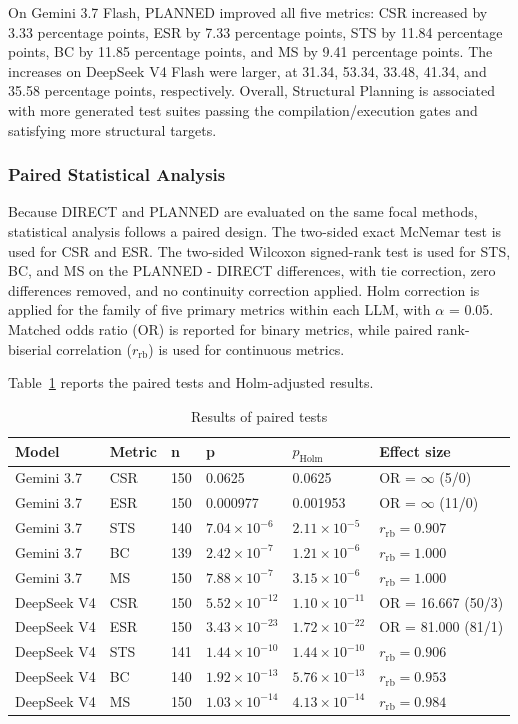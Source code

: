 \documentclass[pdflatex,sn-basic,Numbered,iicol]{sn-jnl}
\begin{document}
On Gemini 3.7 Flash, PLANNED improved all five metrics: CSR increased by 3.33 percentage points, ESR by 7.33 percentage points, STS by 11.84 percentage points, BC by 11.85 percentage points, and MS by 9.41 percentage points. The increases on DeepSeek V4 Flash were larger, at 31.34, 53.34, 33.48, 41.34, and 35.58 percentage points, respectively. Overall, Structural Planning is associated with more generated test suites passing the compilation/execution gates and satisfying more structural targets.

\subsubsection{Paired Statistical Analysis}\label{subsubsec:rq1-paired}

Because DIRECT and PLANNED are evaluated on the same focal methods, statistical analysis follows a paired design. The two-sided exact McNemar test is used for CSR and ESR. The two-sided Wilcoxon signed-rank test is used for STS, BC, and MS on the PLANNED - DIRECT differences, with tie correction, zero differences removed, and no continuity correction applied. Holm correction is applied for the family of five primary metrics within each LLM, with \ensuremath{\alpha} = 0.05. Matched odds ratio (OR) is reported for binary metrics, while paired rank-biserial correlation ($r_{\mathrm{rb}}$) is used for continuous metrics.

Table~\ref{tab:rq1-paired} reports the paired tests and Holm-adjusted results.

\begin{table}[htbp]
\caption{Results of paired tests}\label{tab:rq1-paired}
\centering
\scriptsize
\begin{tabular}{@{}llllll@{}}
\toprule
Model & Metric & n & p & $p_{\mathrm{Holm}}$ & Effect size \\
\midrule
Gemini 3.7 & CSR & 150 & 0.0625 & 0.0625 & OR = $\infty$ (5/0) \\
Gemini 3.7 & ESR & 150 & 0.000977 & 0.001953 & OR = $\infty$ (11/0) \\
Gemini 3.7 & STS & 140 & $7.04\times10^{-6}$ & $2.11\times10^{-5}$ & $r_{\mathrm{rb}}=0.907$ \\
Gemini 3.7 & BC & 139 & $2.42\times10^{-7}$ & $1.21\times10^{-6}$ & $r_{\mathrm{rb}}=1.000$ \\
Gemini 3.7 & MS & 150 & $7.88\times10^{-7}$ & $3.15\times10^{-6}$ & $r_{\mathrm{rb}}=1.000$ \\
DeepSeek V4 & CSR & 150 & $5.52\times10^{-12}$ & $1.10\times10^{-11}$ & OR = 16.667 (50/3) \\
DeepSeek V4 & ESR & 150 & $3.43\times10^{-23}$ & $1.72\times10^{-22}$ & OR = 81.000 (81/1) \\
DeepSeek V4 & STS & 141 & $1.44\times10^{-10}$ & $1.44\times10^{-10}$ & $r_{\mathrm{rb}}=0.906$ \\
DeepSeek V4 & BC & 140 & $1.92\times10^{-13}$ & $5.76\times10^{-13}$ & $r_{\mathrm{rb}}=0.953$ \\
DeepSeek V4 & MS & 150 & $1.03\times10^{-14}$ & $4.13\times10^{-14}$ & $r_{\mathrm{rb}}=0.984$ \\
\bottomrule
\end{tabular}
\end{table}
\end{document}
